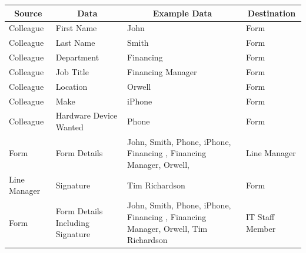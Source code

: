 \begin{longtable}{|p{3cm}|p{3cm}|p{3cm}|p{3cm}|}
\hline
\multicolumn{1}{|c|}{\textbf{Source}} & \multicolumn{1}{c|}{\textbf{Data}} & \multicolumn{1}{c|}{\textbf{Example Data}}         & \multicolumn{1}{c|}{\textbf{Destination}} \\ \hline
Colleague                             & First Name                         & John                                               & Form                                      \\ \hline
Colleague                             & Last Name                          & Smith                                              & Form                                      \\ \hline
Colleague                             & Department                              & Financing                                            & Form                                      \\ \hline
Colleague                             & Job Title                              & Financing Manager                                          & Form                                      \\ \hline
Colleague                             & Location                              & Orwell                                            & Form                                      \\ \hline
Colleague                             & Make                              & iPhone                                             & Form                                      \\ \hline
Colleague                             & Hardware Device Wanted             & Phone                                              & Form                                      \\ \hline
Form                                  & Form Details                       & John, Smith, Phone, iPhone, Financing , Financing Manager, Orwell,            & Line Manager                              \\ \hline
Line Manager                          & Signature                          & Tim Richardson                                     & Form                                      \\ \hline
Form                                  & Form Details Including Signature   & John, Smith, Phone, iPhone, Financing , Financing Manager, Orwell, Tim Richardson & IT Staff Member                           \\ \hline

\end{longtable}
